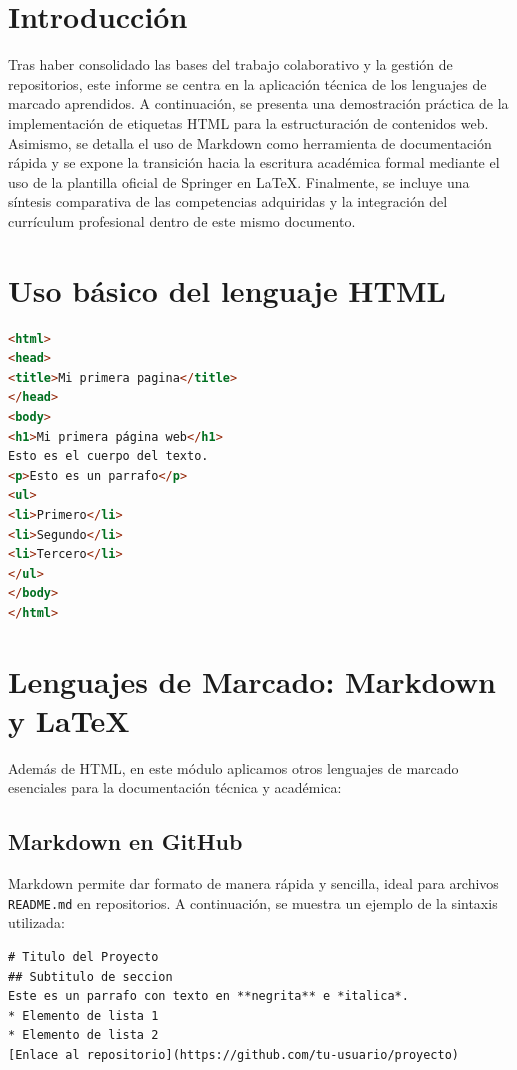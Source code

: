 \documentclass[runningheads]{llncs}
\begin{document}
\section{Introducción}
Tras haber consolidado las bases del trabajo colaborativo y la gestión de repositorios, este informe se centra en la aplicación técnica de los lenguajes de marcado aprendidos. A continuación, se presenta una demostración práctica de la implementación de etiquetas HTML para la estructuración de contenidos web. Asimismo, se detalla el uso de Markdown como herramienta de documentación rápida y se expone la transición hacia la escritura académica formal mediante el uso de la plantilla oficial de \cite{colabgithub}Springer en LaTeX. Finalmente, se incluye una síntesis comparativa de las competencias adquiridas y la integración del currículum profesional dentro de este mismo documento.

\section{Uso básico del lenguaje HTML}

\begin{lstlisting}[language=HTML]
<html>
<head>
<title>Mi primera pagina</title>
</head>
<body>
<h1>Mi primera página web</h1>
Esto es el cuerpo del texto.
<p>Esto es un parrafo</p>
<ul>
<li>Primero</li>
<li>Segundo</li>
<li>Tercero</li>
</ul>
</body>
</html>
\end{lstlisting}

\section{Lenguajes de Marcado: Markdown y LaTeX}

Además de HTML, en este módulo aplicamos otros lenguajes de marcado esenciales para la documentación técnica y académica:

\subsection{Markdown en GitHub}
Markdown permite dar formato de manera rápida y sencilla, ideal para archivos \texttt{README.md} en repositorios. A continuación, se muestra un ejemplo de la sintaxis utilizada:

\begin{lstlisting}[caption=Ejemplo de sintaxis Markdown]
# Titulo del Proyecto
## Subtitulo de seccion
Este es un parrafo con texto en **negrita** e *italica*.
* Elemento de lista 1
* Elemento de lista 2
[Enlace al repositorio](https://github.com/tu-usuario/proyecto)
\end{lstlisting}
\end{document}
